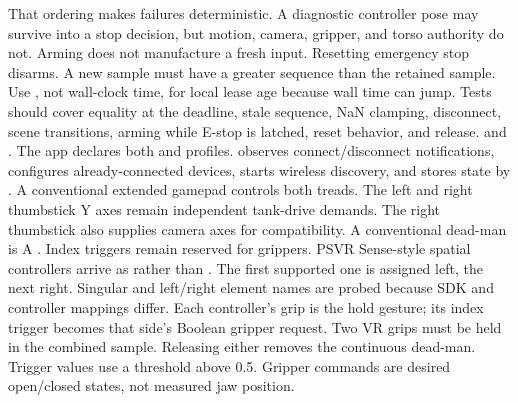 {}That ordering makes failures deterministic. A diagnostic controller pose may survive into a stop decision, but motion, camera, gripper, and torso authority do not.\markdownRendererParagraphSeparator
{}Arming does not manufacture a fresh input. Resetting emergency stop disarms. A new sample must have a greater sequence than the retained sample. Use , not wall-clock time, for local lease age because wall time can jump.\markdownRendererParagraphSeparator
{}Tests should cover equality at the deadline, stale sequence, NaN clamping, disconnect, scene transitions, arming while E-stop is latched, reset behavior, and release.\markdownRendererInterblockSeparator
{}
\markdownRendererSectionEnd \markdownRendererSectionBegin
{}\markdownRendererInterblockSeparator
{}\markdownRendererBlockQuoteBegin
{}  and .\markdownRendererBlockQuoteEnd \markdownRendererInterblockSeparator
{}The app declares both  and  profiles.  observes connect/disconnect notifications, configures already-connected devices, starts wireless discovery, and stores state by .\markdownRendererParagraphSeparator
{}A conventional extended gamepad controls both treads. The left and right thumbstick Y axes remain independent tank-drive demands. The right thumbstick also supplies camera axes for compatibility. A conventional dead-man is A . Index triggers remain reserved for grippers.\markdownRendererParagraphSeparator
{}PSVR Sense-style spatial controllers arrive as  rather than . The first supported one is assigned left, the next right. Singular and left/right element names are probed because SDK and controller mappings differ. Each controller's grip is the hold gesture; its index trigger becomes that side's Boolean gripper request.\markdownRendererParagraphSeparator
{}Two VR grips must be held in the combined sample. Releasing either removes the continuous dead-man. Trigger values use a threshold above 0.5. Gripper commands are desired open/closed states, not measured jaw position.\markdownRendererParagraphSeparator
